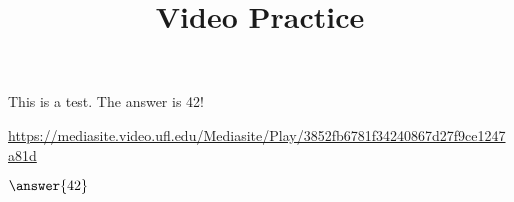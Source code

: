 \documentclass[•]{ximera}
\title{Video Practice}
\author{}
\date{}
\begin{document}
\maketitle
\begin{problem}

This is a test.  The answer is 42!

\begin{hint}
\url{https://mediasite.video.ufl.edu/Mediasite/Play/3852fb6781f34240867d27f9ce1247a81d}
\end{hint}

$\answer{42}$

\end{problem}
\end{document}
